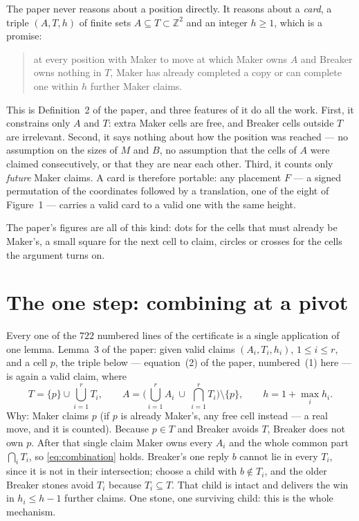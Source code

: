 \documentclass[11pt,a4paper]{article}
\newcommand{\Z}{\mathbb Z}
\begin{document}
The paper never reasons about a position directly. It reasons about a
\emph{card}, a triple $(A,T,h)$ of finite sets $A\subseteq T\subset\Z^2$ and an
integer $h\ge1$, which is a promise:

\begin{quote}
at every position with Maker to move at which Maker owns $A$ and Breaker owns
nothing in $T$, Maker has already completed a copy or can complete one within $h$
further Maker claims.
\end{quote}

This is Definition~2 of the paper, and three features of it do all the work.
First, it constrains only $A$ and $T$: extra Maker cells are free, and Breaker
cells outside $T$ are irrelevant. Second, it says nothing about how the position
was reached --- no assumption on the sizes of $M$ and $B$, no assumption that the
cells of $A$ were claimed consecutively, or that they are near each other. Third,
it counts only \emph{future} Maker claims. A card is therefore portable: any
placement $F$ --- a signed permutation of the coordinates followed by a
translation, one of the eight of Figure~1 --- carries a valid card to a valid one
with the same height.

The paper's figures are all of this kind: dots for the cells that must already be
Maker's, a small square for the next cell to claim, circles or crosses for the
cells the argument turns on.

\section{The one step: combining at a pivot}\label{sec:pivot}

Every one of the $722$ numbered lines of the certificate is a single application
of one lemma. Lemma~3 of the paper: given valid claims $(A_i,T_i,h_i)$,
$1\le i\le r$, and a cell $p$, the triple below --- equation~(2) of the paper,
numbered~(1) here --- is again a valid claim, where
\begin{equation}\label{eq:combination}
T=\{p\}\cup\bigcup_{i=1}^{r}T_i,\qquad
A=\Big(\bigcup_{i=1}^{r}A_i\ \cup\ \bigcap_{i=1}^{r}T_i\Big)\setminus\{p\},
\qquad h=1+\max_i h_i .
\end{equation}
Why: Maker claims $p$ (if $p$ is already Maker's, any free cell instead --- a real
move, and it is counted). Because $p\in T$ and Breaker avoids $T$, Breaker does
not own $p$. After that single claim Maker owns every $A_i$ and the whole common
part $\bigcap_iT_i$, so \eqref{eq:combination} holds. Breaker's one reply $b$
cannot lie in every $T_i$, since it is not in their intersection; choose a child
with $b\notin T_i$, and the older Breaker stones avoid $T_i$ because
$T_i\subseteq T$. That child is intact and delivers the win in $h_i\le h-1$
further claims. One stone, one surviving child: this is the whole mechanism.
\end{document}
